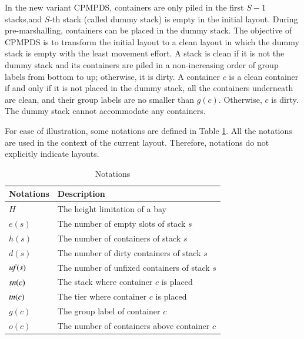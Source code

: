 \documentclass[review,3p,times,authoryear,12pt]{elsarticle}
\begin{document}
In the new variant CPMPDS, containers are only piled in the first $S-1$ stacks,and $S$-th stack (called dummy stack) is empty in the initial layout. During pre-marshalling, containers can be placed in the dummy stack. The objective of CPMPDS is to transform the initial layout to a clean layout in which the dummy stack is empty with the least movement effort. A stack is clean if it is not the dummy stack and its containers are piled in a non-increasing order of group labels from bottom to up; otherwise, it is dirty. A container $c$ is a clean container if and only if it is not placed in the dummy stack, all the containers underneath are clean, and their group labels are no smaller than $g(c)$. Otherwise, $c$ is dirty. The dummy stack cannot accommodate any containers.

For ease of illustration, some notations are defined in Table \ref{tab:1}. All the notations are used in the context of the current layout. Therefore, notations do not explicitly indicate layouts.

\begin{table}[htbp]
  \centering
  \caption{Notations}
  \label{tab:1}
    \begin{tabular}{l|l}
    \hline
    Notations         & Description \\
    \hline
    $H$               & The height limitation of a bay\\
    $e(s)$            & The number of empty slots of stack $s$\\
    $h(s)$            & The number of containers of stack $s$\\
    $d(s)$            & The number of dirty containers of stack $s$\\
    $\id{uf}(s)$      & The number of unfixed containers of stack $s$\\
    $\id{sn}(c)$      & The stack where container $c$ is placed\\
    $\id{tn}(c)$      & The tier where container $c$ is placed\\
    $g(c)$            & The group label of container $c$\\
    $o(c)$          & The number of containers above container $c$\\
    \hline
    \end{tabular}
\end{table}
\end{document}

